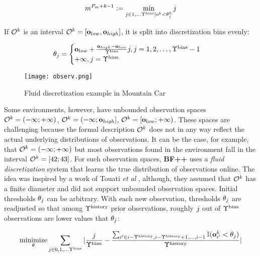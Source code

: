 \begin{equation}
\label{eq:discretization}
m^{P_m+k-1} := \min_{j \in 1,\dots \Upsilon^\text{bins} | o^k < \theta^k_j} j
\end{equation}

If $\mathcal{O}^k$ is an interval $\mathcal{O}^k=[\mathbf{o}_{low}, \mathbf{o}_{high}]$, it is split into discretization bins evenly:

\begin{equation}
\label{eq:static-thresholds}
\theta_j = \begin{cases}
\mathbf{o}_{low}+\frac{\mathbf{o}_{high}-\mathbf{o}_{low}}{\Upsilon^\text{bins}}j, j=1,2,\dots,\Upsilon^\text{bins}-1 \\
+\infty, j=\Upsilon^\text{bins} 
\end{cases}
\end{equation}

\begin{figure}
    \centering
    \texttt{[image: observ.png]}
    \caption{Fluid discretization example in Mountain Car}
    \label{fig:obs}
\end{figure}

Some environments, however, have unbounded observation spaces $\mathcal{O}^k=(-\infty;+\infty)$, $\mathcal{O}^k=(-\infty;\mathbf{o}_{high}]$,  $\mathcal{O}^k=[\mathbf{o}_{low};+\infty)$.
These spaces are challenging because the formal description $\mathcal{O}^k$ does not in any way reflect the actual underlying distributions of observations.
It can be the case, for example, that $\mathcal{O}^k=(-\infty;+\infty)$ but most observations found in the environment fall in the interval $\mathcal{O}^k=[42;43]$.
For such observation spaces, \textbf{BF++} uses a \textit{fluid discretization} system that learns the true distribution of observations online. The idea was inspired by a work of Touati {\sl et al} \cite{adaptivediscretization}, although, they assumed that $\mathcal{O}^k$ has a finite diameter and did not support unbounded observation spaces.
Initial thresholds $\theta_j$ can be arbitrary.
With each new observation, thresholds $\theta_j$ are readjusted so that among $\Upsilon^\text{history}$ prior observations, roughly $j$ out of $\Upsilon^\text{bins}$  observations are lower values that $\theta_j$:

\begin{equation}
\underset{\theta}{\text{minimize}} \sum_{j \in 0,1,\dots \Upsilon^\text{bins}} |\frac{j}{\Upsilon^\text{bins}} - \frac{\sum_{i' \in i-\Upsilon^\text{history},i-\Upsilon^\text{history}+1,\dots,i-1} \mathbb{I}(\mathbf{o}_{i'}^k < \theta_j)}{\Upsilon^\text{history}}|
\end{equation}


